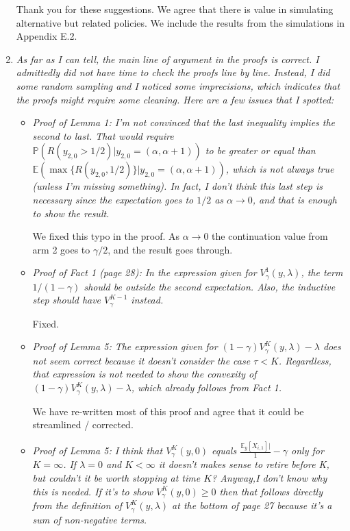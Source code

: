 \documentclass[11pt]{article}
\newcommand{\1}{\ensuremath{\mathbf{1}}} %
\theoremstyle{thm-sf}
\begin{document}
\begin{enumerate}
	Thank you for these suggestions. We agree that there is value in simulating alternative but related policies. We include the results from the simulations in Appendix E.2.

	\item {\it As far as I can tell, the main line of argument in the proofs is correct. I admittedly did not have time to check the proofs line by line. Instead, I did some random sampling and I noticed some imprecisions, which indicates that the proofs might require some cleaning. Here are a few issues that I spotted:}
		
		\begin{itemize}
			\item {\it Proof of Lemma 1: I'm not convinced that the last inequality implies the second to last.
			 That would require $\mathbb P(R(y_{2,0} > 1/2)| y_{2,0} = (\alpha, \alpha + 1))$ to be greater or equal than $\mathbb E (\max \{R(y_{2,0}, 1/2 )\} | y_{2,0} = (\alpha, \alpha + 1))$, which is not always true (unless I'm missing something).
			 In fact, I don't think this last step is necessary since the expectation goes to $1/2$ as $\alpha \to 0$, and that is enough to show the result.}
			 
			 We fixed this typo in the proof. As $\alpha \to 0$ the continuation value from arm 2 goes to $\gamma/2$, and the result goes through.
			 
			 \item {\it Proof of Fact 1 (page 28): In the expression given for $V^1_\gamma(y, \lambda)$, the term $1/(1-\gamma)$ should be outside the second expectation. Also, the inductive step should have $V^{K-1}_\gamma$ instead.}
			 
			 Fixed.
			 
			 \item {\it Proof of Lemma 5: The expression given for $(1 - \gamma) V_\gamma^K (y, \lambda) - \lambda$ does not seem correct because it doesn't consider the case $\tau < K$. Regardless, that expression is not needed to show the convexity of $(1 - \gamma) V_\gamma^K (y, \lambda) - \lambda$, which already follows from Fact 1.}
			 
			 We have re-written most of this proof and agree that it could be streamlined / corrected.
			 
			 \item {\it Proof of Lemma 5: I think that $V^{K}_\gamma(y, 0)$ equals $\frac{\mathbb E_y[X_{i,1}]|}1-\gamma$ only for $K = \infty$. If $\lambda = 0$ and $K < \infty$ it doesn't makes sense to retire before K, but couldn't it be worth stopping at time $K$? Anyway,I don't know why this is needed. If it's to show $V^{K}_\gamma(y, 0) \geq 0$ then that follows directly from the definition of $V^{K}_\gamma(y, \lambda)$ at the bottom of page 27 because it's a sum of non-negative terms.}
			 

\end{itemize}
\end{enumerate}
\end{document}
